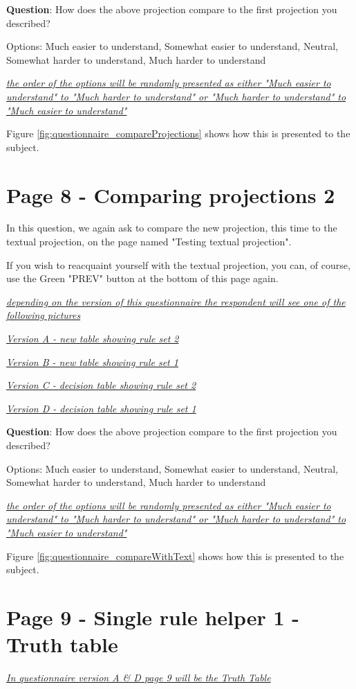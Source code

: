 \textbf{Question}: How does the above projection compare to the first projection you described?

Options: Much easier to understand, Somewhat easier to understand, Neutral, Somewhat harder to understand, Much harder to understand

\emph{\underline{the order of the options will be randomly presented as either "Much easier to understand" to "Much harder to understand" or "Much harder to understand" to "Much easier to understand" }}

Figure \ref{fig:questionnaire_compareProjections} shows how this is presented to the subject.

\section{Page 8 - Comparing projections 2}

In this question, we again ask to compare the new projection, this time to the textual projection, on the page named "Testing textual projection".

If you wish to reacquaint yourself with the textual projection, you can, of course, use the Green "PREV" button at the bottom of this page again.

\emph{\underline{depending on the version of this questionnaire the respondent will see one of the following pictures}}

\emph{\underline{Version A - new table showing rule set 2}}

\emph{\underline{Version B - new table showing rule set 1}}

\emph{\underline{Version C - decision table showing rule set 2}}

\emph{\underline{Version D - decision table showing rule set 1}}

\textbf{Question}: How does the above projection compare to the first projection you described?

Options: Much easier to understand, Somewhat easier to understand, Neutral, Somewhat harder to understand, Much harder to understand

\emph{\underline{the order of the options will be randomly presented as either "Much easier to understand" to "Much harder to understand" or "Much harder to understand" to "Much easier to understand" }}

Figure \ref{fig:questionnaire_compareWithText} shows how this is presented to the subject.

\section{Page 9 - Single rule helper 1 - Truth table}
\emph{\underline{In questionnaire version A \& D page 9 will be the Truth Table}}

